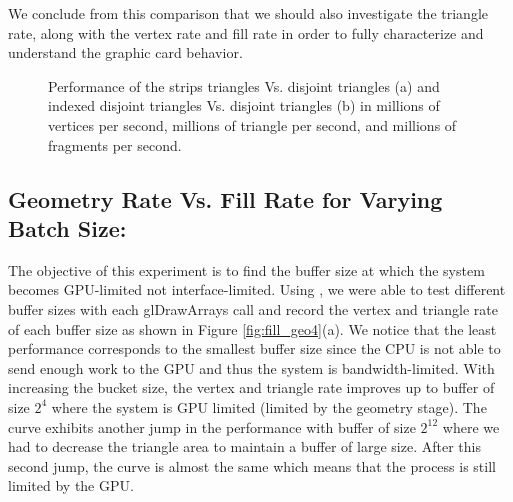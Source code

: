 We conclude from this comparison that we should also investigate the triangle rate, along with the vertex rate and fill rate in order to fully characterize and understand the graphic card behavior.
\begin{figure}[!tbh]
 \centering  
  \caption{Performance of the strips triangles Vs. disjoint triangles (a) and indexed disjoint triangles Vs. disjoint triangles (b) in millions of vertices per second, millions of triangle per second, and millions of fragments per second. }
   \label{fig:fill_geo3}
\end{figure} 


\subsection{Geometry Rate Vs. Fill Rate for Varying Batch Size:}
The objective of this experiment is to find the buffer size at which the system becomes GPU-limited not interface-limited. Using \protect{\wes}, we were able to test different buffer sizes with each {\selectfont glDrawArrays} call and record the vertex and triangle rate of each buffer size as shown in Figure \ref{fig:fill_geo4}(a). We notice that the least performance corresponds to the smallest buffer size since the CPU is not able to send enough work to the GPU and thus the system is bandwidth-limited. With increasing the bucket size, the vertex and triangle rate improves up to buffer of size $2^{4}$ where the system is GPU limited (limited by the geometry stage). The curve exhibits another jump in the performance with buffer of size $2^{12}$ where we had to decrease the triangle area to maintain a buffer of large size. After this second jump, the curve is almost the same which means that the process is still limited by the GPU. 

